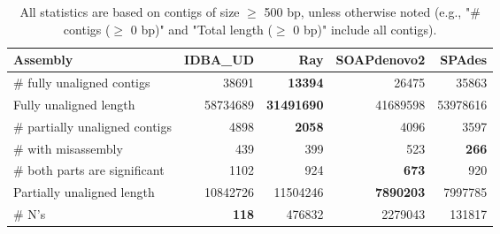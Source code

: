 \documentclass[12pt,a4paper]{article}
\begin{document}
\begin{table}[ht]
\begin{center}
\caption{All statistics are based on contigs of size $\geq$ 500 bp, unless otherwise noted (e.g., "\# contigs ($\geq$ 0 bp)" and "Total length ($\geq$ 0 bp)" include all contigs).}
\begin{tabular}{|l*{4}{|r}|}
\hline
Assembly & IDBA\_UD & Ray & SOAPdenovo2 & SPAdes \\ \hline
\# fully unaligned contigs & 38691 & {\bf 13394} & 26475 & 35863 \\ \hline
Fully unaligned length & 58734689 & {\bf 31491690} & 41689598 & 53978616 \\ \hline
\# partially unaligned contigs & 4898 & {\bf 2058} & 4096 & 3597 \\ \hline
\hspace{5mm}\# with misassembly & 439 & 399 & 523 & {\bf 266} \\ \hline
\hspace{5mm}\# both parts are significant & 1102 & 924 & {\bf 673} & 920 \\ \hline
Partially unaligned length & 10842726 & 11504246 & {\bf 7890203} & 7997785 \\ \hline
\# N's & {\bf 118} & 476832 & 2279043 & 131817 \\ \hline
\end{tabular}
\end{center}
\end{table}
\end{document}
